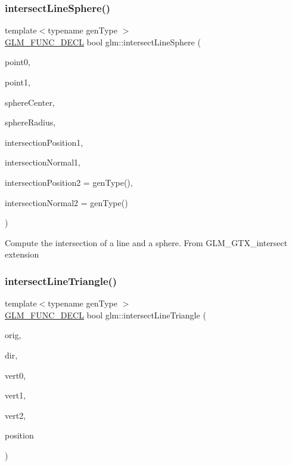\subsubsection{\texorpdfstring{intersect\+Line\+Sphere()}{intersectLineSphere()}}
{\footnotesize\ttfamily template$<$typename gen\+Type $>$ \\
\hyperlink{setup_8hpp_ab2d052de21a70539923e9bcbf6e83a51}{G\+L\+M\+\_\+\+F\+U\+N\+C\+\_\+\+D\+E\+CL} bool glm\+::intersect\+Line\+Sphere (\begin{DoxyParamCaption}\item[{gen\+Type const \&}]{point0,  }\item[{gen\+Type const \&}]{point1,  }\item[{gen\+Type const \&}]{sphere\+Center,  }\item[{typename gen\+Type\+::value\+\_\+type}]{sphere\+Radius,  }\item[{gen\+Type \&}]{intersection\+Position1,  }\item[{gen\+Type \&}]{intersection\+Normal1,  }\item[{gen\+Type \&}]{intersection\+Position2 = {\ttfamily genType()},  }\item[{gen\+Type \&}]{intersection\+Normal2 = {\ttfamily genType()} }\end{DoxyParamCaption})}

Compute the intersection of a line and a sphere. From G\+L\+M\+\_\+\+G\+T\+X\+\_\+intersect extension \mbox{\label{group__gtx__intersect_ga9d29b9b3acb504d43986502f42740df4}} 
\subsubsection{\texorpdfstring{intersect\+Line\+Triangle()}{intersectLineTriangle()}}
{\footnotesize\ttfamily template$<$typename gen\+Type $>$ \\
\hyperlink{setup_8hpp_ab2d052de21a70539923e9bcbf6e83a51}{G\+L\+M\+\_\+\+F\+U\+N\+C\+\_\+\+D\+E\+CL} bool glm\+::intersect\+Line\+Triangle (\begin{DoxyParamCaption}\item[{gen\+Type const \&}]{orig,  }\item[{gen\+Type const \&}]{dir,  }\item[{gen\+Type const \&}]{vert0,  }\item[{gen\+Type const \&}]{vert1,  }\item[{gen\+Type const \&}]{vert2,  }\item[{gen\+Type \&}]{position }\end{DoxyParamCaption})}

